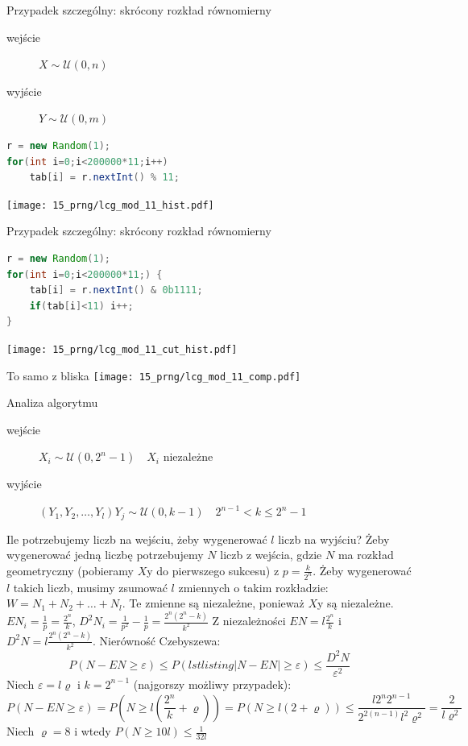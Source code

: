 \documentclass{mp}
\begin{document}
\begin{frame}[fragile]{Przypadek szczególny: skrócony rozkład równomierny}
\begin{description}
\item[wejście] $X\sim\mathcal{U}(0,n)$
\item[wyjście] $Y\sim\mathcal{U}(0,m)$
\end{description}
\pause
\begin{lstlisting}[language=Java,linebackgroundcolor={\btLstHL{3}}]
r = new Random(1);
for(int i=0;i<200000*11;i++)
    tab[i] = r.nextInt() % 11;
\end{lstlisting}
\pause
\begin{center}
\texttt{[image: 15\_prng/lcg\_mod\_11\_hist.pdf]}
\end{center}
\end{frame}
\begin{frame}[fragile]{Przypadek szczególny: skrócony rozkład równomierny}
\begin{lstlisting}[language=Java,linebackgroundcolor={\btLstHL{3}}]
r = new Random(1);
for(int i=0;i<200000*11;) {
    tab[i] = r.nextInt() & 0b1111;
    if(tab[i]<11) i++;
}
\end{lstlisting}
\pause
\vspace{-8mm}
\begin{center}
\texttt{[image: 15\_prng/lcg\_mod\_11\_cut\_hist.pdf]}
\end{center}
\end{frame}
\begin{frame}{To samo z bliska}
\centering
\texttt{[image: 15\_prng/lcg\_mod\_11\_comp.pdf]}
\end{frame}
\begin{frame}{Analiza algorytmu}
\begin{description}
\item[wejście] $X_i\sim\mathcal{U}(0,2^n-1)\quad X_i$ niezależne
\item[wyjście] $(Y_1, Y_2, \ldots, Y_l)$\qquad $Y_j\sim\mathcal{U}(0,k-1)\quad 2^{n-1}<k\leq 2^n-1$
\end{description}
\pause
\alert{Ile potrzebujemy liczb na wejściu, żeby wygenerować $l$ liczb na wyjściu?}
{
\tiny
Żeby wygenerować jedną liczbę potrzebujemy $N$ liczb z wejścia, gdzie $N$ ma rozkład geometryczny (pobieramy $X$y do pierwszego sukcesu) z $p=\frac{k}{2^n}$.
Żeby wygenerować $l$ takich liczb, musimy zsumować $l$ zmiennych o takim rozkładzie: $W=N_1+N_2+\ldots+N_l$.
Te zmienne są niezależne, ponieważ $X$y są niezależne.
$EN_i=\frac{1}{p}=\frac{2^n}{k}$, $D^2N_i=\frac{1}{p^2}-\frac{1}{p}=\frac{2^n(2^n-k)}{k^2}$
Z niezależności $EN=l\frac{2^n}{k}$ i $D^2N=l\frac{2^n(2^n-k)}{k^2}$.
Nierówność Czebyszewa:
\[ P(N-EN\geq \varepsilon) \leq P(lstlisting\left|N-EN\right|\geq \varepsilon)\leq \frac{D^2N}{\varepsilon^2} \]
Niech $\varepsilon=l\varrho$ i $k=2^{n-1}$ (najgorszy możliwy przypadek):
\[ P(N-EN\geq \varepsilon) = P(N\geq l(\frac{2^n}{k}+\varrho)) = P(N\geq l(2+\varrho)) \leq \frac{l2^n2^{n-1}}{2^{2(n-1)}l^2\varrho^2}=\frac{2}{l\varrho^2}  \]
Niech $\varrho=8$ i wtedy $P(N\geq 10l)\leq \frac{1}{32l}$
}
\end{frame}
\end{document}
